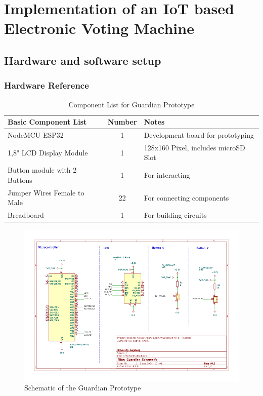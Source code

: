 \chapter{Implementation of an IoT based Electronic Voting Machine}

\section{Hardware and software setup}
\subsection{Hardware Reference}
\begin{table}[h!]
    \centering
    \begin{tabular}{|l|c|p{5cm}|}
        \hline
        \textbf{Basic Component List} & \textbf{Number} & \textbf{Notes} \\
        \hline
        NodeMCU ESP32  & 1 & Development board for prototyping \\
        \hline
        1,8" LCD Display Module  & 1 & 128x160 Pixel, includes microSD Slot \\
        \hline
        Button module with 2 Buttons & 1 & For interacting \\
        \hline
		Jumper Wires Female to Male & 22 & For connecting components \\
        \hline
        Breadboard & 1 & For building circuits \\
        \hline
    \end{tabular}
    \caption{Component List for Guardian Prototype}\label{tab:hardware-components}
\end{table}

\begin{figure}
	\centering
	\includegraphics[scale=.7]{abbildungen/schematic.png}
	\caption{Schematic of the Guardian Prototype}\label{Fig:schematic} 
\end{figure}

